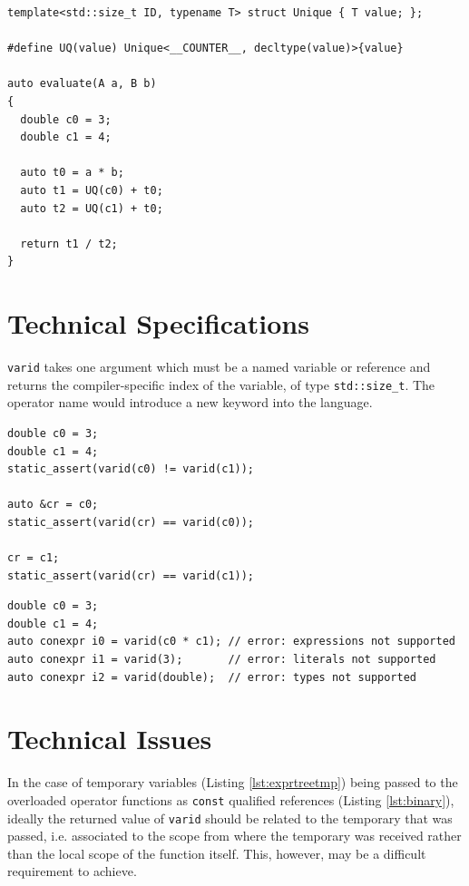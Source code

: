 \documentclass[a4paper,10pt]{article}
\begin{document}
\begin{lstlisting}[float, caption={\texttt{\_\_COUNTER\_\_} could be used as a mechanism to generate unique types.}, label=lst:exprtreealt]
template<std::size_t ID, typename T> struct Unique { T value; };

#define UQ(value) Unique<__COUNTER__, decltype(value)>{value}

auto evaluate(A a, B b)
{
  double c0 = 3;
  double c1 = 4;

  auto t0 = a * b;
  auto t1 = UQ(c0) + t0;
  auto t2 = UQ(c1) + t0;

  return t1 / t2;
}
\end{lstlisting}

\section{Technical Specifications}

\texttt{varid} takes one argument which must be a named variable or reference and returns the compiler-specific index of the variable, of type \texttt{std::size\_t}. The operator name would introduce a new keyword into the language.

\begin{lstlisting}[caption={Valid uses of \texttt{varid}}, label=lst:vaild]
double c0 = 3;
double c1 = 4;
static_assert(varid(c0) != varid(c1));

auto &cr = c0;
static_assert(varid(cr) == varid(c0));

cr = c1;
static_assert(varid(cr) == varid(c1));
\end{lstlisting}


\begin{lstlisting}[caption={Invalid uses of \texttt{varid}}, label=lst:invalid]
double c0 = 3;
double c1 = 4;
auto conexpr i0 = varid(c0 * c1); // error: expressions not supported
auto conexpr i1 = varid(3);       // error: literals not supported
auto conexpr i2 = varid(double);  // error: types not supported
\end{lstlisting}


\section{Technical Issues}
In the case of temporary variables (Listing \ref{lst:exprtreetmp}) being passed to the overloaded operator functions as \texttt{const} qualified references (Listing \ref{lst:binary}), ideally the returned value of \texttt{varid} should be related to the temporary that was passed, i.e. associated to the scope from where the temporary was received rather than the local scope of the function itself. This, however, may be a difficult requirement to achieve.
\end{document}
